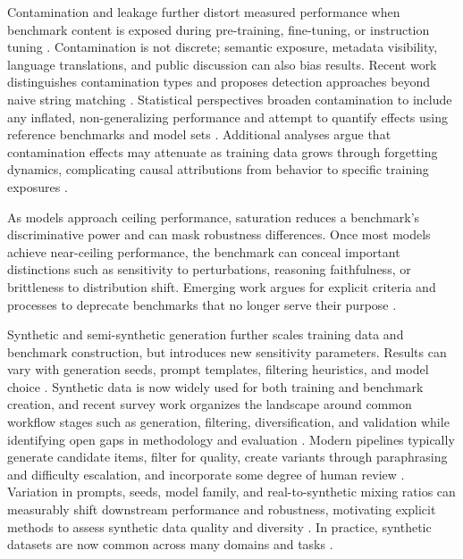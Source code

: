 Contamination and leakage further distort measured performance when benchmark content is exposed during pre-training, fine-tuning, or instruction tuning \cite{Cheng_2024_Benchmark_Data_Contamination, oren_black_box_contamination_2023}. Contamination is not discrete; semantic exposure, metadata visibility, language translations, and public discussion can also bias results. Recent work distinguishes contamination types and proposes detection approaches beyond naive string matching \cite{Cheng_2024_Benchmark_Data_Contamination, oren_black_box_contamination_2023, yangRethinkingBenchmarkContamination2023, sainzNLPEvaluationTrouble2023, Ahuja_2024_Multilingual_Benchmark_Contamination}. Statistical perspectives broaden contamination to include any inflated, non-generalizing performance and attempt to quantify effects using reference benchmarks and model sets \cite{Dekoninck_2024_ConStat}. Additional analyses argue that contamination effects may attenuate as training data grows through forgetting dynamics, complicating causal attributions from behavior to specific training exposures \cite{Bordt_2024_Forgetting_Data_Contamination}. 

As models approach ceiling performance, saturation reduces a benchmark's discriminative power and can mask robustness differences. Once most models achieve near-ceiling performance, the benchmark can conceal important distinctions such as sensitivity to perturbations, reasoning faithfulness, or brittleness to distribution shift. Emerging work argues for explicit criteria and processes to deprecate benchmarks that no longer serve their purpose \cite{Ayrton_San_Joaquin_2025_Deprecating_Benchmarks}.

Synthetic and semi-synthetic generation further scales training data and benchmark construction, but introduces new sensitivity parameters. Results can vary with generation seeds, prompt templates, filtering heuristics, and model choice \cite{chen_diversity_2024, varshneyCreatingSyntheticData2024}. Synthetic data is now widely used for both training and benchmark creation, and recent survey work organizes the landscape around common workflow stages such as generation, filtering, diversification, and validation while identifying open gaps in methodology and evaluation \cite{long_LLMsDrivenSyntheticData_2024}. Modern pipelines typically generate candidate items, filter for quality, create variants through paraphrasing and difficulty escalation, and incorporate some degree of human review \cite{gunasekar_Textbooks_Are_All_2023, xu_Wizard_LMEmpoweringLarge2025, fuQGEvalBenchmarkingMultidimensional2024}. Variation in prompts, seeds, model family, and real-to-synthetic mixing ratios can measurably shift downstream performance and robustness, motivating explicit methods to assess synthetic data quality and diversity \cite{chenDiversitySyntheticData2024}. In practice, synthetic datasets are now common across many domains and tasks \cite{thakurLeveragingLLMsSynthesizing2023, cifarelliSafuraiCsharpHarnessingSynthetic2023, huggingface_syntheticdatamoney_2024}.


